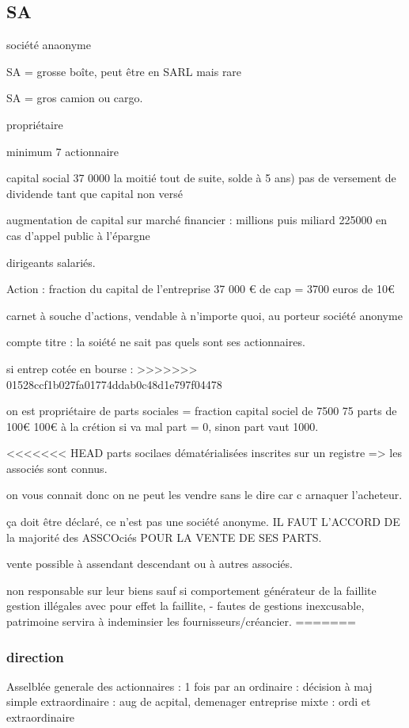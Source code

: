 \documentclass[a4paper,12pt]{article}
\begin{document}
\subsection{SA} société anaonyme

SA = grosse boîte, peut être en SARL mais rare

SA = gros camion ou cargo.

propriétaire

minimum 7 actionnaire

capital social 37 0000
la moitié tout de suite, solde à 5 ans) pas de versement de dividende tant que capital non versé

augmentation de capital sur marché financier : millions puis miliard
225000 en cas d'appel public à l'épargne

dirigeants salariés.

Action : fraction du capital de l'entreprise 37 000 € de cap = 3700 euros de 10€

carnet à souche d'actions, vendable à n'importe quoi, au porteur
société anonyme

compte titre : la soiété ne sait pas quels sont ses actionnaires.

si entrep cotée en bourse : 
>>>>>>> 01528ccf1b027fa01774ddab0c48d1e797f04478

on est propriétaire de parts sociales = fraction capital sociel de 7500 75 parts de 100€
100€ à la crétion si va mal part = 0, sinon part vaut 1000.

<<<<<<< HEAD
parts socilaes dématérialisées inscrites sur un registre => les associés sont connus.

on vous connait donc on ne peut les vendre sans le dire car c arnaquer l'acheteur.

ça doit être déclaré, ce n'est pas une société anonyme.
IL FAUT L'ACCORD DE la majorité des ASSCOciés POUR LA VENTE DE SES PARTS.

vente possible à assendant descendant ou à autres associés.

non responsable sur leur biens sauf si comportement générateur de la faillite
gestion illégales avec pour effet la faillite, 
- fautes de gestions inexcusable,
patrimoine servira à indeminsier les fournisseurs/créancier.
=======
\subsubsection{direction}

Asselblée generale des actionnaires : 1 fois par an
ordinaire : décision à maj simple
extraordinaire : aug de acpital, demenager entreprise
mixte : ordi et extraordinaire
\end{document}
